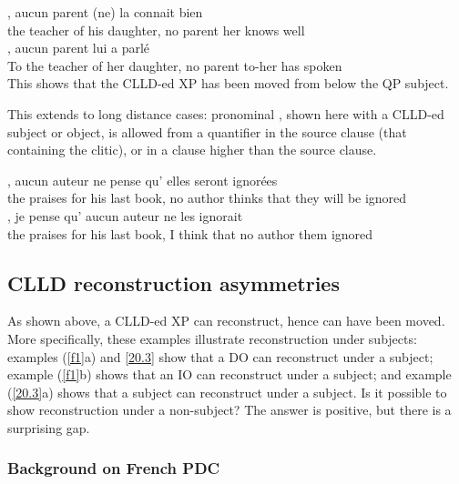 \documentclass[output=paper]{langsci/langscibook}
\begin{document}
\ea \label{f1}
\ea
	,  aucun parent  (ne) la 	connait bien \\
    {} the teacher of his daughter, no parent \hphantom{(}\Neg{} her knows well\\
\ex
	,  aucun parent 	lui 	a parl\'{e} \\
    {} To the teacher of her daughter, no parent to-her has spoken\\
\z
\z
%
This shows that the \gls{CLLD}-ed XP has been moved from below the QP subject.

This extends to long distance cases: pronominal , shown here with
a \gls{CLLD}-ed subject or object, is allowed from a quantifier in the source
clause (that containing the clitic), or in a clause higher  than the source
clause.

\ea \label{20.3}
\ea
{},
aucun auteur ne     pense     qu'    elles  seront  ignor\'{e}es\\
    {} the    praises       for  his    last      book,     no       author
    \Neg{}  thinks    that   they   {will be} ignored\\
\ex {},     je pense     qu'    aucun auteur ne  les  ignorait\\
    {}  the    praises       for  his    last      book,     I  think    that
    no author \Neg{} them ignored\\
\z
\z
%
\subsection{CLLD reconstruction asymmetries}

As shown above, a \gls{CLLD}-ed XP can reconstruct, hence can have been moved.
More specifically, these examples illustrate reconstruction under subjects:
examples (\ref{f1}a) and \eqref{20.3} show that a DO can reconstruct under a
subject; example (\ref{f1}b) shows that an IO can reconstruct under a subject;
and example (\ref{20.3}a) shows that a subject can reconstruct under a subject.
Is it possible to show reconstruction under a non-subject? The answer is
positive, but there is a surprising gap.

\subsubsection{Background on French PDC}
\end{document}
